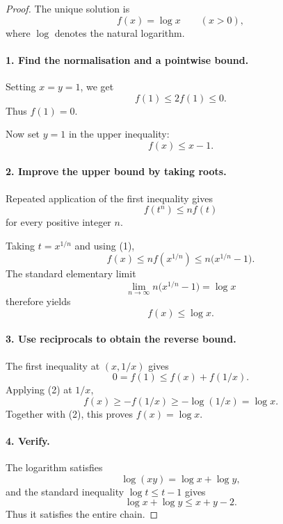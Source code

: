 
\begin{dlsummary}[title={\bfseries Solution 51. The Logarithm Hidden in a Chain},breakable]

\begin{proof}
The unique solution is
\[
\boxed{f(x)=\log x\qquad(x>0),}
\]
where \(\log\) denotes the natural logarithm.

\paragraph{1. Find the normalisation and a pointwise bound.}

Setting \(x=y=1\), we get
\[
f(1)\le2f(1)\le0.
\]
Thus \(f(1)=0\).

Now set \(y=1\) in the upper inequality:
\[
\boxed{f(x)\le x-1.} \tag{1}
\]

\paragraph{2. Improve the upper bound by taking roots.}

Repeated application of the first inequality gives
\[
f(t^n)\le n f(t)
\]
for every positive integer \(n\).

Taking \(t=x^{1/n}\) and using (1),
\[
f(x)\le n f(x^{1/n})
\le n\bigl(x^{1/n}-1\bigr).
\]
The standard elementary limit
\[
\lim_{n\to\infty}n\bigl(x^{1/n}-1\bigr)=\log x
\]
therefore yields
\[
\boxed{f(x)\le\log x.} \tag{2}
\]

\paragraph{3. Use reciprocals to obtain the reverse bound.}

The first inequality at \((x,1/x)\) gives
\[
0=f(1)\le f(x)+f(1/x).
\]
Applying (2) at \(1/x\),
\[
f(x)\ge-f(1/x)\ge-\log(1/x)=\log x.
\]
Together with (2), this proves \(f(x)=\log x\).

\paragraph{4. Verify.}

The logarithm satisfies
\[
\log(xy)=\log x+\log y,
\]
and the standard inequality \(\log t\le t-1\) gives
\[
\log x+\log y\le x+y-2.
\]
Thus it satisfies the entire chain.
\end{proof}
\end{dlsummary}

